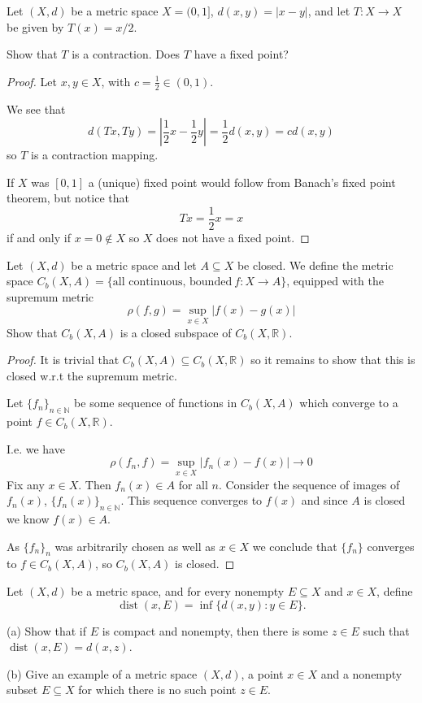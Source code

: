 \begin{prob}
    Let $(X,d)$ be a metric space $X = (0,1]$, $d(x,y) = |x-y|$, 
    and let $T:X \to X$ be given by $T(x) = x/2$. 

    Show that $T$ is a contraction. Does $T$ have a fixed point?
\end{prob}
\begin{proof}
    Let $x,y \in X$, with $c = \frac{1}{2} \in (0,1)$. 
    
    We see that 
    \[
        d(Tx,Ty) = \left|\frac{1}{2}x - \frac{1}{2}y\right| = 
        \frac{1}{2}d(x,y)
        = cd(x,y)
    \]
    so $T$ is a contraction mapping.

    If $X$ was $[0,1]$ a (unique) fixed point would follow 
    from Banach's 
    fixed point theorem, but notice that 
    \[
        Tx = \frac{1}{2}x = x 
    \]
    if and only if $x = 0\not\in X$ so $X$ does not have a fixed 
    point.
\end{proof}
\begin{prob}
    Let $(X,d)$ be a metric space and let $A \subseteq X$ be 
    closed. We define the metric space $C_b(X,A) = \{\text{all 
    continuous, bounded} \ f: X \to A\}$, equipped with the 
    supremum metric 
    \[
        \rho(f,g) = \sup_{x\in X}|f(x) - g(x)| 
    \]
    Show that $C_b(X,A)$ is a closed subspace of $C_b(X,\mathbb R)$.
\end{prob}
\begin{proof}
    It is trivial that $C_b(X,A) \subseteq C_b(X,\mathbb R)$ so 
    it remains to show that this is closed w.r.t the supremum 
    metric. 
 
    Let $\{f_n\}_{n\in\mathbb N}$ be some sequence of functions 
    in $C_b(X,A)$ which converge to a point $f \in C_b(X,\mathbb R)$.

    I.e. we have 
    \[
        \rho(f_n,f) = \sup_{x\in X}|f_n(x) - f(x)| \to 0
    \]
    Fix any $x \in X$. Then 
    $f_n(x) \in A$ for all $n$. Consider the sequence of images 
    of $f_n(x)$, $\{f_n(x)\}_{n\in\mathbb N}$. This sequence converges
    to $f(x)$ and since $A$ is closed we know $f(x) \in A$.

    As $\{f_n\}_n$ was arbitrarily chosen as well as $x \in X$ we 
    conclude that $\{f_n\}$ converges to $f \in C_b(X,A)$, 
    so $C_b(X,A)$ is closed.
\end{proof}
\begin{prob}
    Let $(X,d)$ be a metric space, and for every nonempty 
    $E \subseteq X$ and $x \in X$, define 
    \[
        \operatorname{dist}(x,E) = \inf\{d(x,y) : y \in E\}.
    \]

    (a) Show that if $E$ is compact and nonempty, then there 
    is some $z \in E$ such that $\operatorname{dist}(x,E) = d(x,z)$.

    (b) Give an example of a metric space $(X,d)$, a point 
    $x \in X$ and a nonempty subset $E \subseteq X$ for which there 
    is no such point $z \in E$.
\end{prob}

